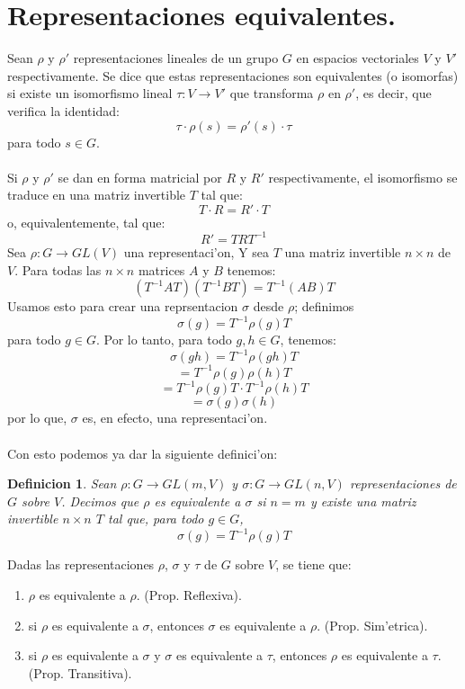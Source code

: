 \documentclass[a4paper,openright,12pt]{book}
\numberwithin{equation}{section} %
\newtheorem{definicion}{Definicion}[section] %
\begin{document}
\section{Representaciones equivalentes.}
Sean $\rho$ y $\rho'$ representaciones lineales de un grupo $G$ en espacios vectoriales $V$ y $V'$ respectivamente. Se dice que estas representaciones son equivalentes (o isomorfas) si existe un isomorfismo lineal $\tau : V \rightarrow V'$ que transforma $\rho$ en $\rho'$, es decir, que verifica la identidad:
\[
\tau \cdot \rho (s) = \rho' (s) \cdot \tau
\]
para todo $s \in G$.\\
\\
Si $\rho$ y $\rho'$ se dan en forma matricial por $R$ y $R'$ respectivamente, el isomorfismo se traduce en una matriz invertible $T$ tal que:
\[
T \cdot R = R' \cdot T
\]
o, equivalentemente, tal que:
\[
R' = TRT^{-1}
\] 
Sea $\rho : G \rightarrow GL(V)$ una representaci'on, Y sea $T$ una matriz invertible $n \times n$ de $V$. Para todas las $n \times n$ matrices $A$ y $B$ tenemos:
\[
(T^{-1}AT)(T^{-1}BT)=T^{-1}(AB)T
\]
Usamos esto para crear una reprsentacion $\sigma$ desde $\rho$; definimos
\[
\sigma (g) = T^{-1}\rho (g) T
\]
para todo $g \in G$. Por lo tanto, para todo $g,h \in G$, tenemos:
\[
\sigma (gh) = T^{-1} \rho (gh) T
\]
\[
= T^{-1}\rho (g) \rho (h) T
\]
\[
=T^{-1}\rho (g)T \cdot T^{-1}\rho (h)T 
\]
\[
=\sigma (g) \sigma (h)
\]
por lo que, $\sigma$ es, en efecto, una representaci'on.\\
\\
Con esto podemos ya dar la siguiente definici'on:
\begin{definicion}
Sean $\rho : G \rightarrow GL(m,V)$ y $\sigma : G \rightarrow GL(n,V)$ representaciones de $G$ sobre $V$. Decimos que $\rho$ es equivalente a $\sigma$ si $n=m$ y existe una matriz invertible $n \times n$ $T$ tal que, para todo $g \in G$,
\[
\sigma (g) = T^{-1} \rho (g) T
\]
\end{definicion}
Dadas las representaciones $\rho$, $\sigma$ y $\tau$ de $G$ sobre $V$, se tiene que:
\begin{enumerate}
\item $\rho$ es equivalente a $\rho$. (Prop. Reflexiva).
\item si $\rho$ es equivalente a $\sigma$, entonces $\sigma$ es equivalente a $\rho$. (Prop. Sim'etrica).
\item si $\rho$ es equivalente a $\sigma$ y $\sigma$ es equivalente a $\tau$, entonces $\rho$ es equivalente a $\tau$. (Prop. Transitiva).
\end{enumerate}
\end{document}

